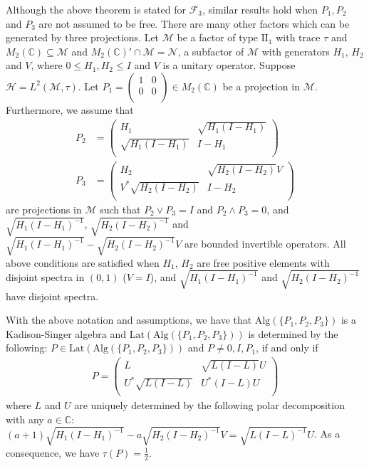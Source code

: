\documentclass{pnastwo}
\newcommand{\F}{\mathcal F}
\newcommand{\HHH}{\mathcal H} %
\newcommand{\M}{\mathcal M}
\newcommand{\NNN}{\mathcal N} %
\newcommand{\II}{\mathrm{II}}
\newcommand{\Lat}{\mathrm{Lat}}
\newcommand{\Alg}{\mathrm{Alg}}
\newcommand{\C}{\mathbb C} %
\begin{document}
\begin{article}
Although the above theorem is stated for $\F_3$, similar results
hold when $P_1, P_2$ and $P_3$ are not assumed to be free. There
are many other factors which can be generated by three
projections. Let $\M$ be a factor of type $\II_1$ with trace
$\tau$ and $M_2(\C)\subseteq\M$ and $M_2(\C)'\cap\M=\NNN$, a
subfactor of $\M$ with generators $H_1$, $H_2$ and $V$, where
$0\le H_1, H_2\le I$ and $V$ is a unitary operator. Suppose
$\HHH=L^2(\M,\tau)$. Let $P_1=\left(
     \begin{array}{cc}
       1 & 0 \\
        0 & 0  \\
     \end{array}\right) \in
M_2(\C)$ be a projection in $\M$. Furthermore, we assume that
\begin{align*}
P_2&=\left(
     \begin{array}{cc}
       H_1 & \sqrt{H_1(I-H_1)} \\
        \sqrt{H_1(I-H_1)} & I-H_1 \\
     \end{array}\right) \\
P_3&=\left(
     \begin{array}{cc}
       H_2 & \sqrt{H_2(I-H_2)}V \\
        V^*\sqrt{H_2(I-H_2)} & I-H_2  \\
     \end{array}\right)
\end{align*}
are projections in $\M$ such that  $P_2\vee P_3=I$ and $P_2\wedge
P_3=0$, and $\sqrt{H_1(I-H_1)^{-1}}$, $\sqrt{H_2(I-H_2)^{-1}}$ and
$\sqrt{H_1(I-H_1)^{-1}} -\sqrt{H_2(I-H_2)^{-1}}V$ are bounded
invertible operators. All above conditions are satisfied when
$H_1$, $H_2$ are free positive elements with disjoint spectra in
$(0,1)$ ($V=I$), and $\sqrt{H_1(I-H_1)^{-1}}$ and
$\sqrt{H_2(I-H_2)^{-1}}$ have disjoint spectra.

\begin{theorem}
With the above notation
and assumptions, we have that $\Alg(\{P_1, P_2,P_3\})$ is a
Kadison-Singer algebra and $\Lat(\Alg(\{P_1, P_2,P_3\}))$ is
determined by the following: $P\in\Lat(\Alg(\{P_1, P_2,P_3\}))$
and $P\neq 0, I, P_1$, if and only if
\begin{align*}
P= \left(
     \begin{array}{cc}
       L & \sqrt{L(I-L)}U \\
       U^{*}\sqrt{L(I-L)} & U^{*}(I-L)U \\
     \end{array}\right)
\end{align*}
where $L$ and $U$ are uniquely determined by the following polar
decomposition with any $a\in\C$: $(a+1)\sqrt{H_1(I-H_1)^{-1}} -a
\sqrt{H_2(I-H_2)^{-1}}V=\sqrt{L(I-L)^{-1}}U$. As a consequence, we
have $\tau(P)=\frac12$.
\end{theorem}


\end{article}
\end{document}
